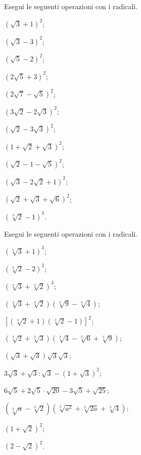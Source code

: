 \begin{esercizio}[\Ast]
 \label{ese:2.56}
Esegui le seguenti operazioni con i radicali.
 \begin{multicols}{3}
 \begin{enumeratea}
 \item $(\sqrt 3+1)^2$;
 \item $(\sqrt 3-3)^2$;
 \item $(\sqrt 5-2)^2$;
 \item $(2\sqrt 5+3)^2$;
 \item $(2\sqrt 7-\sqrt 5)^2$;
 \item $(3\sqrt 2-2\sqrt 3)^2$;
 \item $(\sqrt 2-3\sqrt 3)^2$;
 \item $(1+\sqrt 2+\sqrt 3)^2$;
 \item $(\sqrt 2-1-\sqrt 5)^2$;
 \item $(\sqrt 3-2\sqrt 2+1)^2$;
 \item $(\sqrt 2+\sqrt 3+\sqrt 6)^2$;
 \item $(\sqrt[3]2-1)^3$.
 \end{enumeratea}
 \end{multicols}
\end{esercizio}


\begin{esercizio}[\Ast]
 \label{ese:2.57}
Esegui le seguenti operazioni con i radicali.
 \begin{multicols}{2}
 \begin{enumeratea}
 \item $(\sqrt[3]3+1)^3$;
 \item $(\sqrt[3]2-2)^3$;
 \item $(\sqrt[3]3+\sqrt[3]2)^3$;
 \item $(\sqrt[3]3+\sqrt[3]2)(\sqrt[3]9-\sqrt[3]4)$;
 \item $\left[(\sqrt[4]2+1)(\sqrt[4]2-1)\right]^2$;
 \item $(\sqrt[3]2+\sqrt[3]3)(\sqrt[3]4-\sqrt[3]6+\sqrt[3]9)$;
 \item $(\sqrt 3+\sqrt 3)\sqrt 3 \sqrt 3$;
 \item $3\sqrt 3+\sqrt 3:\sqrt 3-(1+\sqrt 3)^2$;
 \item $6\sqrt 5+2\sqrt 5\cdot \sqrt{20}-3\sqrt 5+\sqrt{25}$;
 \item $(\sqrt[3]a-\sqrt[3]2)(\sqrt[3]{a^2}+\sqrt[3]{2a}+\sqrt[3]4)$;
 \item $(1+\sqrt 2)^2$;
 \item $(2-\sqrt 2)^2$.
 \end{enumeratea}
 \end{multicols}
\end{esercizio}

